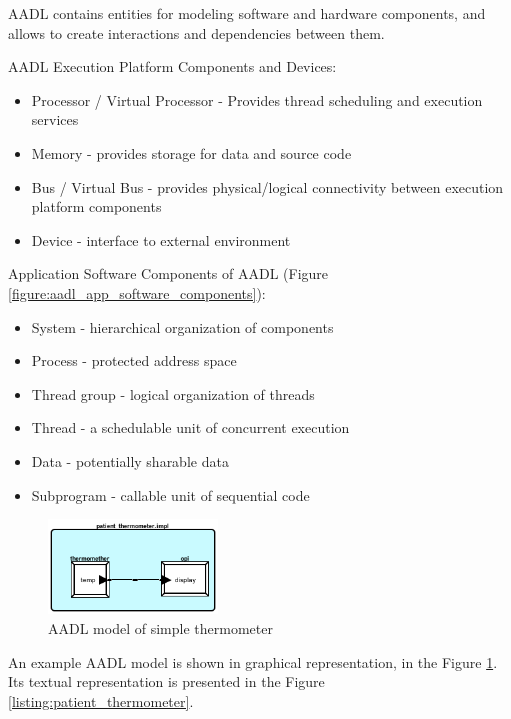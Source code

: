 AADL contains entities for modeling software and hardware components, and allows to create interactions and dependencies between them.

AADL Execution Platform Components and Devices:
\begin{itemize} \itemsep1pt \parskip0pt 
	\item Processor / Virtual Processor - Provides thread scheduling and execution services
	\item Memory - provides storage for data and source code
	\item Bus / Virtual Bus - provides physical/logical connectivity between execution platform components
	\item Device - interface to external environment
\end{itemize}

Application Software Components of AADL (Figure \ref{figure:aadl_app_software_components}):
\begin{itemize} \itemsep1pt \parskip0pt 
	\item System - hierarchical organization of components
	\item Process - protected address space
	\item Thread group - logical organization of threads
	\item Thread - a schedulable unit of concurrent execution
	\item Data - potentially sharable data
	\item Subprogram - callable unit of sequential code
\end{itemize}

\singlespacing
\begin{figure}[ht]%
    \begin{center}
    	\includegraphics[width=0.4\textwidth]{figures/patient_thermometer.png}    	
    \end{center}
    \caption{AADL model of simple thermometer}
    \label{figure:patient_thermometer}
\end{figure}
\doublespacing 

An example AADL model is shown in graphical representation, in the Figure \ref{figure:patient_thermometer}. Its textual representation is presented in the Figure \ref{listing:patient_thermometer}.

